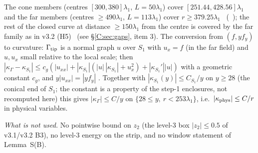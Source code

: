 \documentclass[11pt]{article}
\begin{document}
The cone members (centres $[300,380]\lambda_1$, $L=50\lambda_1$) cover $[251.44,428.56]\lambda_1$ and the far members (centres $\ge490\lambda_1$, $L=113\lambda_1$) cover $r\ge379.25\lambda_1$ \tC\ (\SZ\ ); the rest of the closed curve at distance $\ge150\lambda_1$ from the centre is covered by the far family as in v3.2 (H5) \tH\ (see \S\ref{C:sec:gaps}, item 3). The conversion from $(f,yf_y)$ to curvature: $\Gamma_{\rm tip}$ is a normal graph $u$ over $S_1$ with $u_x=f$ (in the far field) and $u,u_x$ small relative to the local scale; then $|\kappa_\Gamma-\kappa_{S_1}|\le c_g(|u_{xx}|+|\kappa_{S_1}|(|u|\,|\kappa_{S_1}|+u_x^2)+|\kappa_{S_1}'||u|)$ with a geometric constant $c_g$, and $y|u_{xx}|=|yf_y|$ \tP. Together with $|\kappa_{S_1}(y)|\le C_{S_1}/y$ on $y\ge28$ (the conical end of $S_1$; the constant is a property of the step-1 enclosures, not recomputed here) this gives $|\kappa_\Gamma|\le C/y$ on $\{28\le y,\ r<253\lambda_1\}$, i.e.\ $|\kappa_{\rm phys}|\le C/r$ in physical variables.

\noindent\emph{What is not used.} No pointwise bound on $z_2$ (the level-3 box $|z_2|\le0.5$ of v3.1/v3.2 B3), no level-3 energy on the strip, and no window statement of Lemma~S(B).
\end{document}
